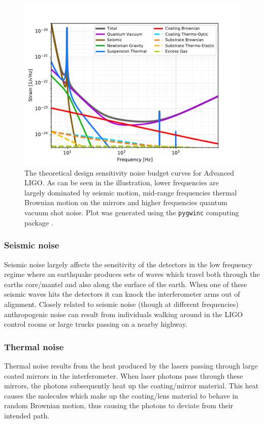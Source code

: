 \begin{figure}
    \centering
    \includegraphics[width=\linewidth]{figures/aLIGO_noise_budget.pdf}
    \caption[Theoretical design sensitivity noise budget curves for Advanced \ac{LIGO}.]{The theoretical design sensitivity noise budget curves for Advanced \ac{LIGO}. As can be seen in the illustration, lower frequencies are largely dominated by seismic motion, mid-range frequencies thermal Brownian motion on the mirrors and higher frequencies quantum vacuum shot noise. Plot was generated using the \texttt{pygwinc} computing package \cite{pygwinc}. }
    \label{fig:aligo_noise_budget}
\end{figure}

\subsubsection{Seismic noise}
Seismic noise largely affects the sensitivity of 
the detectors in the low frequency regime where 
an earthquake produces sets of waves which travel both 
through the earths core/mantel and also along the 
surface of the earth. When one of these seismic waves 
hits the detectors it can knock the interferometer arms 
out of alignment. Closely related to seismic noise 
(though at different frequencies) anthropogenic noise 
can result from individuals walking around in the 
\ac{LIGO} control rooms or large trucks passing 
on a nearby highway.

%
%
\subsubsection{Thermal noise}
Thermal noise results from the heat produced by 
the lasers passing through large coated mirrors in 
the interferometer. When laser photons pass through 
these mirrors, the photons subsequently heat up 
the coating/mirror material. This heat causes the molecules 
which make up the coating/lens material to behave in 
random Brownian motion, thus causing the photons to deviate from 
their intended path.

